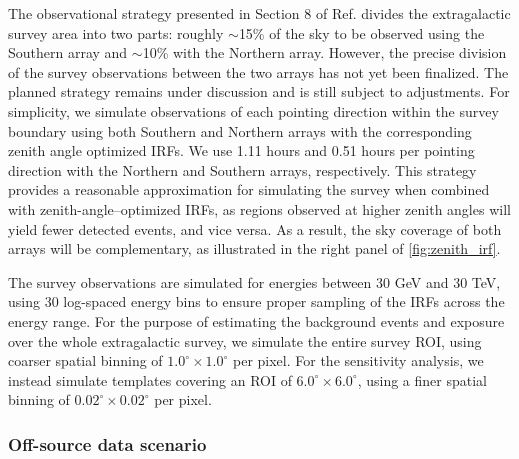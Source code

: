 The observational strategy presented in Section 8 of Ref. \cite{CTAConsortium:2017dvg} divides the extragalactic survey area into two parts: roughly $\sim$15\% of the sky {to be} observed using the Southern array and $\sim$10\% with the Northern array. {However, the precise division of the survey observations between the two arrays has not yet been finalized. The planned strategy remains under discussion and is still subject to adjustments.} For simplicity, we simulate observations of each pointing direction within the survey boundary using both Southern and Northern arrays with the corresponding zenith angle optimized IRFs. We use 1.11 hours and 0.51 hours per pointing direction with the Northern and Southern arrays, respectively. {This strategy provides a reasonable approximation for simulating the survey when combined with zenith-angle–optimized IRFs, as regions observed at higher zenith angles will yield fewer detected events, and vice versa.}  As a result, the sky coverage of both arrays will be complementary, as {illustrated} in the right panel of \cref{fig:zenith_irf}.

The survey observations are simulated for energies between 30 GeV and 30 TeV, using 30 log-spaced energy bins to ensure proper sampling of the IRFs across the energy range. For the purpose of estimating the background events and exposure over the whole extragalactic survey, we simulate the entire survey ROI, using coarser spatial binning of $1.0^\circ \times 1.0^\circ$ per pixel. For the sensitivity analysis, we instead simulate templates covering an ROI of $6.0^\circ\times 6.0^\circ$, using a finer spatial binning of $0.02^\circ \times 0.02^\circ$ per pixel.

\subsubsection{Off-source data scenario}

